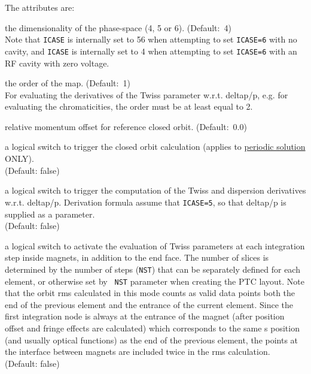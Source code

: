 The attributes are: 
\begin{madlist}

  the dimensionality of the phase-space (4, 5 or
  6). (Default:~4)\\ Note that {\tt ICASE} is internally set to 56 when
  attempting to set {\tt ICASE=6} with no cavity, and {\tt ICASE} is
  internally set to 4 when attempting to set {\tt ICASE=6} with an RF
  cavity with zero voltage.

  the order of the map. (Default:~1)\\ For evaluating the
  derivatives of the Twiss parameter w.r.t. deltap/p, e.g. for
  evaluating the chromaticities, the order must be at least equal to 2.

  relative momentum offset for reference closed orbit. (Default:~0.0) 

  a logical switch to trigger the closed orbit calculation
  (applies to \hyperlink{Periodic_Solution}{periodic solution} ONLY). \\  
  (Default: false)

  a logical switch to trigger the computation of the Twiss and
  dispersion derivatives w.r.t. deltap/p. Derivation formula assume that
  {\tt ICASE=5}, so that deltap/p is supplied as a parameter. \\
  (Default: false)

  a logical switch to activate the evaluation of Twiss parameters at each
  integration step inside magnets, in addition to the end face.  The
  number of slices is determined by the number of steps ({\tt NST}) that
  can be separately defined for each element, or otherwise set by {\tt
    NST} parameter when creating the PTC layout.  Note that the orbit
  rms calculated in this mode counts as valid data points both the end
  of the previous element and the entrance of the current element. Since
  the first integration node is always at the entrance of the magnet
  (after position offset and fringe effects are calculated) which
  corresponds to the same s position (and usually optical functions) as
  the end of the previous element, the points at the interface between
  magnets are included twice in the rms calculation. \\ 
  (Default: false)


\end{madlist}
